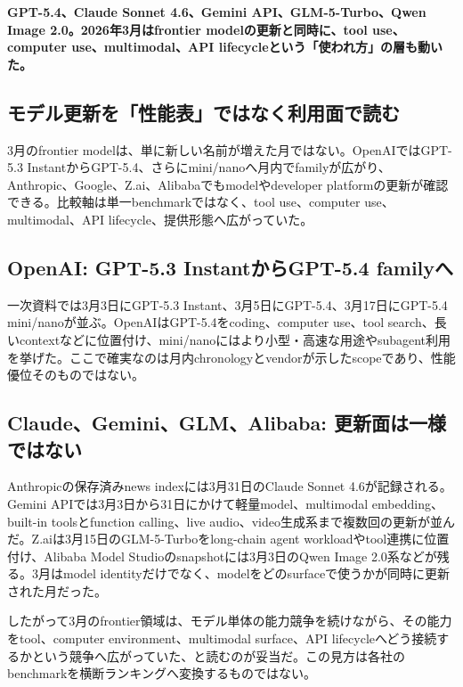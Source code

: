 \noindent\textbf{GPT-5.4、Claude Sonnet 4.6、Gemini API、GLM-5-Turbo、Qwen Image 2.0。2026年3月はfrontier modelの更新と同時に、tool use、computer use、multimodal、API lifecycleという「使われ方」の層も動いた。}\autocite{src-9156c37fb1c2,src-a24fd97eb3d0,src-eac8dfbeb78c,src-eea6230f612a,src-f6aa679babd7}

\subsection{モデル更新を「性能表」ではなく利用面で読む}

3月のfrontier modelは、単に新しい名前が増えた月ではない。OpenAIではGPT-5.3 InstantからGPT-5.4、さらにmini/nanoへ月内でfamilyが広がり、Anthropic、Google、Z.ai、Alibabaでもmodelやdeveloper platformの更新が確認できる。比較軸は単一benchmarkではなく、tool use、computer use、multimodal、API lifecycle、提供形態へ広がっていた。\autocite{src-46b3e364b737,src-8afdb503cc56,src-9156c37fb1c2,src-a24fd97eb3d0,src-eac8dfbeb78c,src-eea6230f612a,src-f6aa679babd7}


\subsection{OpenAI: GPT-5.3 InstantからGPT-5.4 familyへ}

一次資料では3月3日にGPT-5.3 Instant、3月5日にGPT-5.4、3月17日にGPT-5.4 mini/nanoが並ぶ。OpenAIはGPT-5.4をcoding、computer use、tool search、長いcontextなどに位置付け、mini/nanoにはより小型・高速な用途やsubagent利用を挙げた。ここで確実なのは月内chronologyとvendorが示したscopeであり、性能優位そのものではない。\autocite{src-46b3e364b737,src-8afdb503cc56,src-eea6230f612a}


\subsection{Claude、Gemini、GLM、Alibaba: 更新面は一様ではない}

Anthropicの保存済みnews indexには3月31日のClaude Sonnet 4.6が記録される。Gemini APIでは3月3日から31日にかけて軽量model、multimodal embedding、built-in toolsとfunction calling、live audio、video生成系まで複数回の更新が並んだ。Z.aiは3月15日のGLM-5-Turboをlong-chain agent workloadやtool連携に位置付け、Alibaba Model Studioのsnapshotには3月3日のQwen Image 2.0系などが残る。3月はmodel identityだけでなく、modelをどのsurfaceで使うかが同時に更新された月だった。\autocite{src-9156c37fb1c2,src-a24fd97eb3d0,src-eac8dfbeb78c,src-f6aa679babd7}


したがって3月のfrontier領域は、モデル単体の能力競争を続けながら、その能力をtool、computer environment、multimodal surface、API lifecycleへどう接続するかという競争へ広がっていた、と読むのが妥当だ。この見方は各社のbenchmarkを横断ランキングへ変換するものではない。\autocite{src-a24fd97eb3d0,src-eea6230f612a,src-f6aa679babd7}


